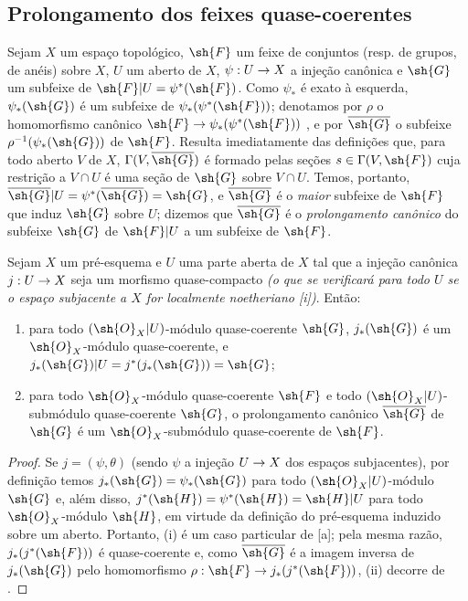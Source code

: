\documentclass[oneside]{amsart}
\makeatletter
\newcommand{\ega@arrow}[2]{\mathchoice{#1}{#2}{#2}{#2}}
\renewcommand{\to}{\ega@arrow{\longrightarrow}{\rightarrow}}
\newcommand{\oldpage}[2][]{{\marginnote{\normalfont\textbf{#1}~|~#2}}\ignorespaces}
\let\EGAOriginalLabel\label
\renewcommand{\label}[1]{\phantomsection\EGAOriginalLabel{#1}}
\makeatother
\begin{document}
\oldpage[I]{174}
\subsection{Prolongamento dos feixes quase-coerentes}
\label{subsection:I.9.4}

\begin{env}[9.4.1]
\label{I.9.4.1}
Sejam $X$ um espaço topológico, $\sh{F}$ um feixe de conjuntos (resp. de grupos, de anéis)
sobre $X$, $U$ um aberto de $X$, $\psi:U\to X$ a injeção canônica e $\sh{G}$ um subfeixe
de $\sh{F}|U=\psi^*(\sh{F})$. Como $\psi_*$ é exato à esquerda, $\psi_*(\sh{G})$ é um
subfeixe de $\psi_*(\psi^*(\sh{F}))$; denotamos por $\rho$ o homomorfismo canônico
$\sh{F}\to\psi_*(\psi^*(\sh{F}))$ , e por $\overline{\sh{G}}$ o subfeixe
$\rho^{-1}(\psi_*(\sh{G}))$ de $\sh{F}$. Resulta imediatamente das definições que, para
todo aberto $V$ de $X$, $\Gamma(V,\overline{\sh{G}})$ é formado pelas seções
$s\in\Gamma(V,\sh{F})$ cuja restrição a $V\cap U$ é uma seção de $\sh{G}$ sobre $V\cap U$.
Temos, portanto, $\overline{\sh{G}}|U=\psi^*(\overline{\sh{G}})=\sh{G}$, e
$\overline{\sh{G}}$ é o \emph{maior} subfeixe de $\sh{F}$ que induz $\sh{G}$ sobre $U$;
dizemos que $\overline{\sh{G}}$ é o \emph{prolongamento canônico} do subfeixe $\sh{G}$ de
$\sh{F}|U$ a um subfeixe de $\sh{F}$.
\end{env}

\begin{proposition}[9.4.2]
\label{I.9.4.2}
Sejam $X$ um pré-esquema e $U$ uma parte aberta de $X$ tal que a injeção canônica
$j:U\to X$ seja um morfismo quase-compacto \emph{(o que se verificará para \emph{todo} $U$ se
o espaço subjacente a $X$ for \emph{localmente noetheriano}
[i])}. Então:
\begin{enumerate}
  \item[{\rm(i)}] para todo $(\sh{O}_X|U)$-módulo quase-coerente $\sh{G}$, $j_*(\sh{G})$
    é um $\sh{O}_X$-módulo quase-coerente, e
    $j_*(\sh{G})|U=j^*(j_*(\sh{G}))=\sh{G}$;
  \item[{\rm(ii)}] para todo $\sh{O}_X$-módulo quase-coerente $\sh{F}$ e todo
    $(\sh{O}_X|U)$-submódulo quase-coerente $\sh{G}$, o prolongamento canônico
    $\overline{\sh{G}}$ de $\sh{G}$  é um
    $\sh{O}_X$-submódulo quase-coerente de $\sh{F}$.
\end{enumerate}
\end{proposition}

\begin{proof}
Se $j=(\psi,\theta)$ (sendo $\psi$ a injeção $U\to X$ dos espaços subjacentes),
por definição temos $j_*(\sh{G})=\psi_*(\sh{G})$ para todo
$(\sh{O}_X|U)$-módulo $\sh{G}$ e, além disso,
$j^*(\sh{H})=\psi^*(\sh{H})=\sh{H}|U$ para todo $\sh{O}_X$-módulo $\sh{H}$, em virtude
da definição do pré-esquema induzido sobre um aberto. Portanto, (i) é um caso
particular de [a]; pela mesma razão, $j_*(j^*(\sh{F}))$ é
quase-coerente e, como $\overline{\sh{G}}$ é a imagem inversa de $j_*(\sh{G})$ pelo
homomorfismo $\rho:\sh{F}\to j_*(j^*(\sh{F}))$, (ii) decorre de .
\end{proof}
\end{document}
